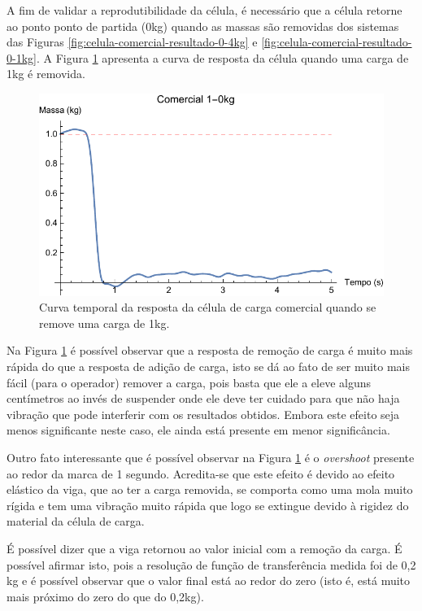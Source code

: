 \documentclass[a4paper]{instrumentacao}
\begin{document}
A fim de validar a reprodutibilidade da célula, é necessário que a célula retorne ao ponto ponto de partida (0kg) quando as massas são removidas dos sistemas das Figuras \ref{fig:celula-comercial-resultado-0-4kg} e \ref{fig:celula-comercial-resultado-0-1kg}. A Figura \ref{fig:celula-comercial-resultado-1-0kg} apresenta a curva de resposta da célula quando uma carga de 1kg é removida.

\begin{figure}[H]
\center
\includegraphics[width=\textwidth]{Comercial_1-0kg.pdf}
\caption{Curva temporal da resposta da célula de carga comercial quando se remove uma carga de 1kg.}
\label{fig:celula-comercial-resultado-1-0kg}
\end{figure}

Na Figura \ref{fig:celula-comercial-resultado-1-0kg} é possível observar que a resposta de remoção de carga é muito mais rápida do que a resposta de adição de carga, isto se dá ao fato de ser muito mais fácil (para o operador) remover a carga, pois basta que ele a eleve alguns centímetros ao invés de suspender onde ele deve ter cuidado para que não haja vibração que pode interferir com os resultados obtidos. Embora este efeito seja menos significante neste caso, ele ainda está presente em menor significância.

Outro fato interessante que é possível observar na Figura \ref{fig:celula-comercial-resultado-1-0kg} é o \textit{overshoot} presente ao redor da marca de 1 segundo. Acredita-se que este efeito é devido ao efeito elástico da viga, que ao ter a carga removida, se comporta como uma mola muito rígida e tem uma vibração muito rápida que logo se extingue devido à rigidez do material da célula de carga.

É possível dizer que a viga retornou ao valor inicial com a remoção da carga. É possível afirmar isto, pois a resolução de função de transferência medida foi de 0,2 kg e é possível observar que o valor final está ao redor do zero (isto é, está muito mais próximo do zero do que do 0,2kg).
\end{document}

